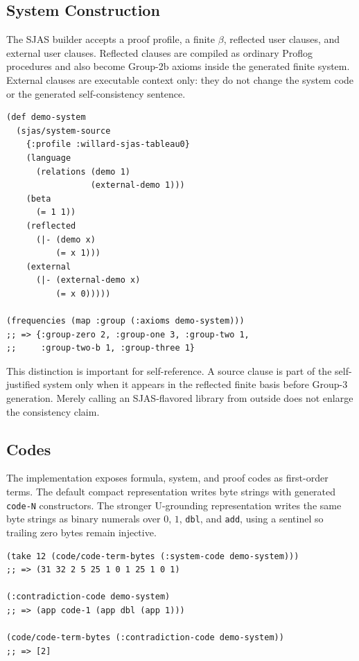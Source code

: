 \documentclass[runningheads]{llncs}
\begin{document}
\subsection{System Construction}

The SJAS builder accepts a proof profile, a finite \(\beta\), reflected user
clauses, and external user clauses.  Reflected clauses are compiled as ordinary
Proflog procedures and also become Group-2b axioms inside the generated finite
system.  External clauses are executable context only: they do not change the
system code or the generated self-consistency sentence.

\begin{lstlisting}
(def demo-system
  (sjas/system-source
    {:profile :willard-sjas-tableau0}
    (language
      (relations (demo 1)
                 (external-demo 1)))
    (beta
      (= 1 1))
    (reflected
      (|- (demo x)
          (= x 1)))
    (external
      (|- (external-demo x)
          (= x 0)))))

(frequencies (map :group (:axioms demo-system)))
;; => {:group-zero 2, :group-one 3, :group-two 1,
;;     :group-two-b 1, :group-three 1}
\end{lstlisting}

This distinction is important for self-reference.  A source clause is part of
the self-justified system only when it appears in the reflected finite basis
before Group-3 generation.  Merely calling an SJAS-flavored library from outside
does not enlarge the consistency claim.

\subsection{Codes}

The implementation exposes formula, system, and proof codes as first-order
terms.  The default compact representation writes byte strings with generated
\texttt{code-N} constructors.  The stronger U-grounding representation writes
the same byte strings as binary numerals over \(0\), \(1\), \texttt{dbl}, and
\texttt{add}, using a sentinel so trailing zero bytes remain injective.

\begin{lstlisting}
(take 12 (code/code-term-bytes (:system-code demo-system)))
;; => (31 32 2 5 25 1 0 1 25 1 0 1)

(:contradiction-code demo-system)
;; => (app code-1 (app dbl (app 1)))

(code/code-term-bytes (:contradiction-code demo-system))
;; => [2]
\end{lstlisting}
\end{document}
